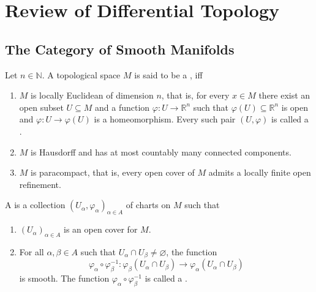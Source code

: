 \chapter{Review of Differential Topology}
\section*{The Category of Smooth Manifolds}

\begin{definition}
	Let $n \in \mathbb{N}$. A topological space $M$ is said to be a , iff
	\begin{enumerate}[label = \textup{(\roman*)},leftmargin=*]
		\item $M$ is locally Euclidean of dimension $n$, that is, for every $x \in M$ there exist an open subset $U \subseteq M$ and a function $\varphi : U \to \mathbb{R}^n$ such that $\varphi(U) \subseteq \mathbb{R}^n$ is open and $\varphi : U \to \varphi(U)$ is a homeomorphism. Every such pair $(U,\varphi)$ is called a .
		\item $M$ is Hausdorff and has at most countably many connected components.
		\item $M$ is paracompact, that is, every open cover of $M$ admits a locally finite open refinement.
	\end{enumerate}
\end{definition}

\begin{definition}
	A  is a collection $(U_\alpha,\varphi_\alpha)_{\alpha \in A}$ of charts on $M$ such that
	\begin{enumerate}[label = \textup{(\roman*)},leftmargin = *]
		\item $(U_\alpha)_{\alpha \in A}$ is an open cover for $M$.
		\item For all $\alpha,\beta \in A$ such that $U_\alpha \cap U_\beta \neq \varnothing$, the function 
			\begin{equation*}
				\varphi_\alpha \circ \varphi_\beta^{-1} : \varphi_\beta(U_\alpha \cap U_\beta) \to \varphi_\alpha(U_\alpha \cap U_\beta)
			\end{equation*}
			\noindent is smooth. The function $\varphi_\alpha \circ \varphi_\beta^{-1}$ is called a .
	\end{enumerate}
\end{definition}

